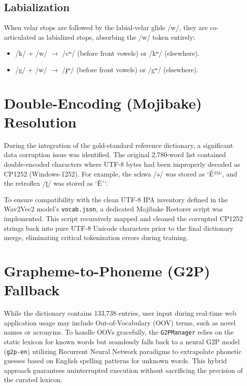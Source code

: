 \subsection{Labialization}
When velar stops are followed by the labial-velar glide /w/, they are co-articulated as labialized stops, absorbing the /w/ token entirely:
\begin{itemize}
    \item /k/ + /w/ $\rightarrow$ /cʷ/ (before front vowels) or /kʷ/ (elsewhere).
    \item /g/ + /w/ $\rightarrow$ /ɟʷ/ (before front vowels) or /gʷ/ (elsewhere).
\end{itemize}

\section{Double-Encoding (Mojibake) Resolution}
During the integration of the gold-standard reference dictionary, a significant data corruption issue was identified. The original 2,780-word list contained double-encoded characters where UTF-8 bytes had been improperly decoded as CP1252 (Windows-1252). For example, the schwa /ə/ was stored as `É™`, and the retroflex /ʈ/ was stored as `Êˆ`.

To ensure compatibility with the clean UTF-8 IPA inventory defined in the Wav2Vec2 model's \texttt{vocab.json}, a dedicated Mojibake Restorer script was implemented. This script recursively mapped and cleaned the corrupted CP1252 strings back into pure UTF-8 Unicode characters prior to the final dictionary merge, eliminating critical tokenization errors during training.

\section{Grapheme-to-Phoneme (G2P) Fallback}
While the dictionary contains 133,738 entries, user input during real-time web application usage may include Out-of-Vocabulary (OOV) terms, such as novel names or acronyms. To handle OOVs gracefully, the \texttt{G2PManager} relies on the static lexicon for known words but seamlessly falls back to a neural G2P model (\texttt{g2p-en}) utilizing Recurrent Neural Network paradigms \cite{rao2015g2p} to extrapolate phonetic guesses based on English spelling patterns for unknown words. This hybrid approach guarantees uninterrupted execution without sacrificing the precision of the curated lexicon.
